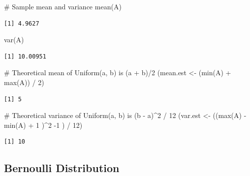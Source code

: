 \documentclass[
  letterpaper,
  DIV=11,
  numbers=noendperiod]{scrreprt}
\newenvironment{Shaded}{\begin{snugshade}}{\end{snugshade}}
\newcommand{\CommentTok}[1]{\textcolor[rgb]{0.37,0.37,0.37}{#1}}
\newcommand{\DecValTok}[1]{\textcolor[rgb]{0.68,0.00,0.00}{#1}}
\newcommand{\FunctionTok}[1]{\textcolor[rgb]{0.28,0.35,0.67}{#1}}
\newcommand{\NormalTok}[1]{\textcolor[rgb]{0.00,0.23,0.31}{#1}}
\newcommand{\OtherTok}[1]{\textcolor[rgb]{0.00,0.23,0.31}{#1}}
\newcommand{\SpecialCharTok}[1]{\textcolor[rgb]{0.37,0.37,0.37}{#1}}
\begin{document}
\begin{Shaded}
\begin{Highlighting}[]
\CommentTok{\# Sample mean and variance}
\FunctionTok{mean}\NormalTok{(A)}
\end{Highlighting}
\end{Shaded}

\begin{verbatim}
[1] 4.9627
\end{verbatim}

\begin{Shaded}
\begin{Highlighting}[]
\FunctionTok{var}\NormalTok{(A)}
\end{Highlighting}
\end{Shaded}

\begin{verbatim}
[1] 10.00951
\end{verbatim}

\begin{Shaded}
\begin{Highlighting}[]
\CommentTok{\# Theoretical mean of Uniform(a, b) is (a + b)/2}
\NormalTok{(mean.est }\OtherTok{\textless{}{-}}\NormalTok{ (}\FunctionTok{min}\NormalTok{(A) }\SpecialCharTok{+} \FunctionTok{max}\NormalTok{(A)) }\SpecialCharTok{/} \DecValTok{2}\NormalTok{)}
\end{Highlighting}
\end{Shaded}

\begin{verbatim}
[1] 5
\end{verbatim}

\begin{Shaded}
\begin{Highlighting}[]
\CommentTok{\# Theoretical variance of Uniform(a, b) is (b {-} a)\^{}2 / 12}
\NormalTok{(var.est }\OtherTok{\textless{}{-}}\NormalTok{ ((}\FunctionTok{max}\NormalTok{(A) }\SpecialCharTok{{-}} \FunctionTok{min}\NormalTok{(A) }\SpecialCharTok{+} \DecValTok{1}\NormalTok{ )}\SpecialCharTok{\^{}}\DecValTok{2} \SpecialCharTok{{-}}\DecValTok{1}\NormalTok{ ) }\SpecialCharTok{/} \DecValTok{12}\NormalTok{)}
\end{Highlighting}
\end{Shaded}

\begin{verbatim}
[1] 10
\end{verbatim}

\subsection{Bernoulli Distribution}\label{bernoulli-distribution}
\end{document}
